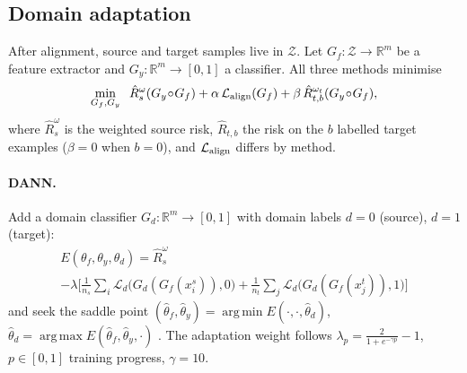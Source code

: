 \documentclass[journal]{IEEEtran}
\newcommand{\R}{\mathbb{R}}
\newcommand{\1}{\mathbf{1}}
\newcommand{\Zspace}{\mathcal{Z}}
\DeclareMathOperator*{\argmin}{arg\,min}
\DeclareMathOperator*{\argmax}{arg\,max}
\begin{document}
\subsection{Domain adaptation}\label{sec:da}
After alignment, source and target samples live in $\Zspace$. Let $G_f:\Zspace\to\R^m$ be a feature extractor and $G_y:\R^m\to[0,1]$ a classifier. All three methods minimise
\begin{equation}
\min_{G_f,G_y}\;\; \hat R^{\omega}_s(G_y\!\circ\!G_f)+\alpha\,\mathcal L_{\rm align}(G_f)+\beta\,\hat R^{\omega_t}_{t,b}(G_y\!\circ\!G_f),
\label{eq:unified}
\end{equation}
where $\hat R_s^\omega$ is the weighted source risk, $\hat R_{t,b}$ the risk on the $b$ labelled target examples ($\beta=0$ when $b=0$), and $\mathcal L_{\rm align}$ differs by method.

\paragraph{DANN.} Add a domain classifier $G_d:\R^m\to[0,1]$ with domain labels $d=0$ (source), $d=1$ (target):
\begin{multline}
E(\theta_f,\theta_y,\theta_d)=\hat R_s^\omega\\
-\lambda\Big[\tfrac1{n_s}\!\sum_{i}\!\mathcal L_d\big(G_d(G_f(x_i^s)),0\big)+\tfrac1{n_t}\!\sum_{j}\!\mathcal L_d\big(G_d(G_f(x_j^t)),1\big)\Big]
\end{multline}
and seek the saddle point $(\hat\theta_f,\hat\theta_y)=\argmin E(\cdot,\cdot,\hat\theta_d)$, $\hat\theta_d=\argmax E(\hat\theta_f,\hat\theta_y,\cdot)$ \cite{ganin2016dann}. The adaptation weight follows $\lambda_p=\frac{2}{1+e^{-\gamma p}}-1$, $p\in[0,1]$ training progress, $\gamma=10$.
\end{document}
